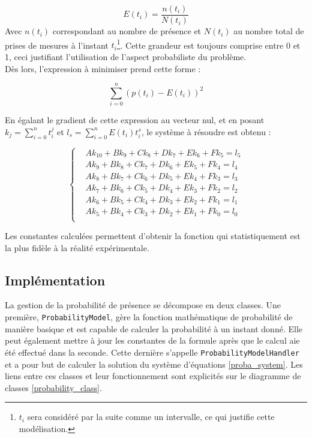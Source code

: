 \documentclass[11pt,a4paper,11pt]{report}
\begin{document}
\begin{equation}
E(t_{i}) = \frac{n(t_{i})}{N(t_{i})}
\end{equation}
Avec $n(t_{i})$ correspondant au nombre de présence et $N(t_{i})$ au nombre total de prises de mesures à l'instant $t_{i}$\footnote{$t_{i}$ sera considéré par la suite comme un intervalle, ce qui justifie cette modélisation.}. Cette grandeur est toujours comprise entre 0 et 1, ceci justifiant l'utilisation de l'aspect probabiliste du problème.\\

Dès lors, l'expression à minimiser prend cette forme : 

\begin{equation}
\sum_{i=0}^{n} (p(t_{i}) - E(t_{i}))^2
\end{equation}

En égalant le gradient de cette expression au vecteur nul, et en posant $k_{j} = \sum_{i=0}^{n} t_{i}^{j}$ et $l_{s}=\sum_{i=0}^{n} E(t_{i})t_{i}^{s}$, le système à résoudre est obtenu : 

\begin{equation}
\left\{
\begin{aligned}
\label{proba_system}
&Ak_{10}+Bk_{9}+Ck_{8}+Dk_{7}+Ek_{6}+Fk_{5} = l_{5}\\
&Ak_{9}+Bk_{8}+Ck_{7}+Dk_{6}+Ek_{5}+Fk_{4} = l_{4}\\
&Ak_{8}+Bk_{7}+Ck_{6}+Dk_{5}+Ek_{4}+Fk_{3} = l_{3}\\
&Ak_{7}+Bk_{6}+Ck_{5}+Dk_{4}+Ek_{3}+Fk_{2} = l_{2}\\
&Ak_{6}+Bk_{5}+Ck_{4}+Dk_{3}+Ek_{2}+Fk_{1} = l_{1}\\
&Ak_{5}+Bk_{4}+Ck_{3}+Dk_{2}+Ek_{1}+Fk_{0} = l_{0}\\
\end{aligned}\right.
\end{equation}

Les constantes calculées permettent d'obtenir la fonction qui statistiquement est la plus fidèle à la réalité expérimentale.

\subsection{Implémentation}

La gestion de la probabilité de présence se décompose en deux classes. Une première,
\newline
\texttt{ProbabilityModel}, gère la fonction mathématique de probabilité de manière basique et est capable de calculer la probabilité à un instant donné. Elle peut également mettre à jour les constantes de la formule après que le calcul aie été effectué dans la seconde. Cette dernière s'appelle \texttt{ProbabilityModelHandler} et a pour but de calculer la solution du système d'équations \ref{proba_system}. Les liens entre ces classes et leur fonctionnement sont explicités sur le diagramme de classes \ref{probability_class}.  
\end{document}
